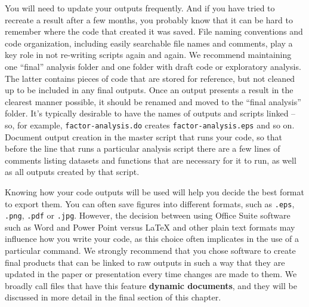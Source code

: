 \documentclass[
]{book}
\begin{document}
You will need to update your outputs frequently.
And if you have tried to recreate a result after a few months,
you probably know that it can be hard to remember where the code that created it was saved.
File naming conventions and code organization,
including easily searchable file names and comments,
play a key role in not re-writing scripts again and again.
We recommend maintaining one ``final'' analysis folder
and one folder with draft code or exploratory analysis.
The latter contains pieces of code that are stored for reference,
but not cleaned up to be included in any final outputs.
Once an output presents a result in the clearest manner possible,
it should be renamed and moved to the ``final analysis'' folder.
It's typically desirable to have the names of outputs and scripts linked --
so, for example, \texttt{factor-analysis.do} creates \texttt{factor-analysis.eps} and so on.
Document output creation in the master script that runs your code,
so that before the line that runs a particular analysis script
there are a few lines of comments listing
datasets and functions that are necessary for it to run,
as well as all outputs created by that script.

Knowing how your code outputs will be used will help you decide the best format to export them.
You can often save figures into different formats,
such as \texttt{.eps}, \texttt{.png}, \texttt{.pdf} or \texttt{.jpg}.
However, the decision between using Office Suite software such as Word and Power Point
versus LaTeX and other plain text formats may influence how you write your code,
as this choice often implicates in the use of a particular command.
We strongly recommend that you chose software to create final products
that can be linked to raw outputs in such a way that they are updated
in the paper or presentation every time changes are made to them.
We broadly call files that have this feature \textbf{dynamic documents},
and they will be discussed in more detail in the final section of this chapter.
\end{document}
